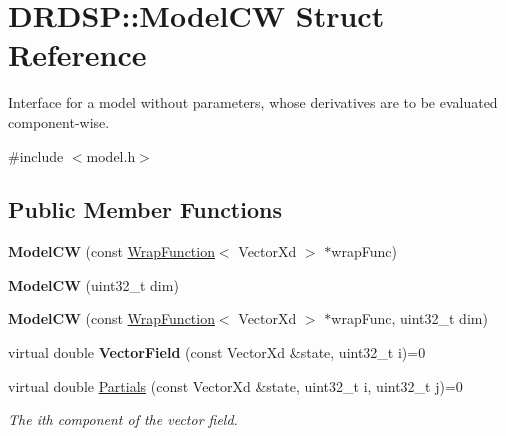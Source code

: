 \hypertarget{struct_d_r_d_s_p_1_1_model_c_w}{\section{D\-R\-D\-S\-P\-:\-:Model\-C\-W Struct Reference}
\label{struct_d_r_d_s_p_1_1_model_c_w}
}


Interface for a model without parameters, whose derivatives are to be evaluated component-\/wise.  




{\ttfamily \#include $<$model.\-h$>$}

\subsection*{Public Member Functions}
\begin{DoxyCompactItemize}
\item 
\hypertarget{struct_d_r_d_s_p_1_1_model_c_w_aad20306afd9f81ea9533041b4a71b35c}{{\bfseries Model\-C\-W} (const \hyperlink{struct_d_r_d_s_p_1_1_wrap_function}{Wrap\-Function}$<$ Vector\-Xd $>$ $\ast$wrap\-Func)}\label{struct_d_r_d_s_p_1_1_model_c_w_aad20306afd9f81ea9533041b4a71b35c}

\item 
\hypertarget{struct_d_r_d_s_p_1_1_model_c_w_a49ebb648ddbec569e773bd6370f47116}{{\bfseries Model\-C\-W} (uint32\-\_\-t dim)}\label{struct_d_r_d_s_p_1_1_model_c_w_a49ebb648ddbec569e773bd6370f47116}

\item 
\hypertarget{struct_d_r_d_s_p_1_1_model_c_w_a2b62d9bd8355ee9661e64818d0de8667}{{\bfseries Model\-C\-W} (const \hyperlink{struct_d_r_d_s_p_1_1_wrap_function}{Wrap\-Function}$<$ Vector\-Xd $>$ $\ast$wrap\-Func, uint32\-\_\-t dim)}\label{struct_d_r_d_s_p_1_1_model_c_w_a2b62d9bd8355ee9661e64818d0de8667}

\item 
\hypertarget{struct_d_r_d_s_p_1_1_model_c_w_a4c01cef09698f8bed8ef2e90e130ad8f}{virtual double {\bfseries Vector\-Field} (const Vector\-Xd \&state, uint32\-\_\-t i)=0}\label{struct_d_r_d_s_p_1_1_model_c_w_a4c01cef09698f8bed8ef2e90e130ad8f}

\item 
\hypertarget{struct_d_r_d_s_p_1_1_model_c_w_a54b6149ba78bba42b360868fa8ecfc20}{virtual double \hyperlink{struct_d_r_d_s_p_1_1_model_c_w_a54b6149ba78bba42b360868fa8ecfc20}{Partials} (const Vector\-Xd \&state, uint32\-\_\-t i, uint32\-\_\-t j)=0}\label{struct_d_r_d_s_p_1_1_model_c_w_a54b6149ba78bba42b360868fa8ecfc20}

\begin{DoxyCompactList}\small\item\em The ith component of the vector field. \end{DoxyCompactList}\end{DoxyCompactItemize}
